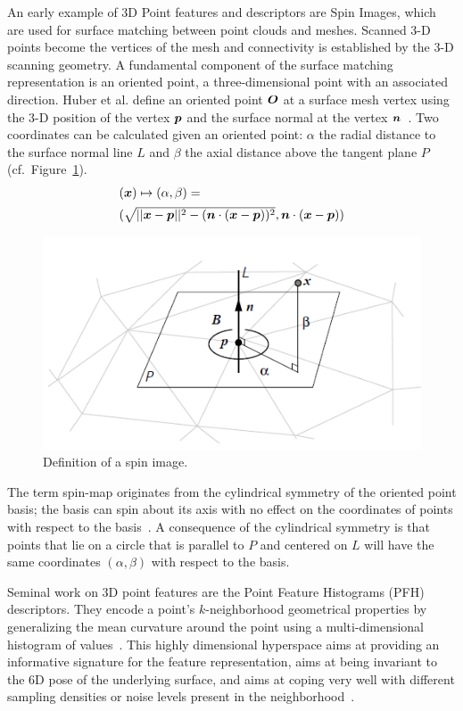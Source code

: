 \documentclass[twocolumn,oneside]{book}
\newcommand{\V}[1]{\vector{#1}}  %
\begin{document}
\begin{itemize}
  An early example of 3D Point features and descriptors are Spin Images,
  which are used for surface matching between point clouds and meshes.
  Scanned 3-D points become the vertices of the mesh and connectivity
  is established by the 3-D scanning geometry. A fundamental component
  of the surface matching representation is an oriented point, a
  three-dimensional point with an associated direction.  Huber et
  al. define an oriented point $\V O$ at a surface mesh vertex using
  the 3-D position of the vertex $\V p$ and the surface normal at the
  vertex $\V n$~\cite{HuberPhD}.  Two coordinates can be calculated
  given an oriented point: $\alpha$ the radial distance to the surface
  normal line $L$ and $\beta$ the axial distance above the tangent
  plane $P$ (cf.~Figure~\ref{fig:spinimage}).
  \begin{align*}
    \begin{array}{l}
  (\V x) \mapsto (\alpha, \beta) = \\[1.1ex]
    (\sqrt{||\V x - \V p||^2 - ( \V n \cdot (\V x -\V p))^2},
      \V n \cdot (\V x - \V p))
      \end{array}
  \end{align*}
  \begin{figure}
    \centering
    \includegraphics[width=0.75\linewidth]{BOOKFIGS/spinimage}
    \caption{Definition of a spin image.}\label{fig:spinimage}
  \end{figure}

  The term spin-map originates from the cylindrical symmetry of the
  oriented point basis; the basis can spin about its axis with no
  effect on the coordinates of points with respect to the
  basis~\cite{HuberPhD}. A consequence of the cylindrical symmetry is
  that points that lie on a circle that is parallel to $P$ and centered
  on $L$ will have the same coordinates $(\alpha,\beta)$ with respect
  to the basis.
 
  Seminal work on 3D point features are the Point Feature Histograms
  (PFH) descriptors. They encode a point's $k$-neighborhood geometrical
  properties by generalizing the mean curvature around the point using
  a multi-dimensional histogram of values~\cite{RaduPhD}. This highly
  dimensional hyperspace aims at providing an informative signature
  for the feature representation, aims at being invariant to the 6D
  pose of the underlying surface, and aims at coping very well with
  different sampling densities or noise levels present in the
  neighborhood~\cite{pointclouds.org}.


\end{itemize}
\end{document}
